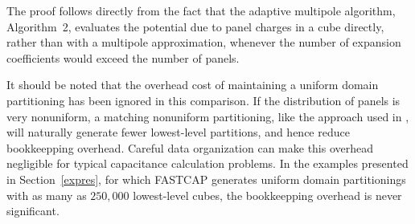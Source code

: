 The proof follows directly from the fact that the adaptive multipole
algorithm, Algorithm~2, evaluates the potential due to panel charges in a cube
directly, rather than with a multipole approximation, whenever the
number of expansion coefficients would exceed the number of panels.

It should be noted that the overhead cost of maintaining a uniform
domain partitioning has been ignored in this comparison.  If the
distribution of panels is very nonuniform, a matching nonuniform
partitioning, like the approach used in \cite{carrie}, will naturally
generate fewer lowest-level partitions, and hence reduce bookkeepping
overhead. Careful data organization can make this overhead negligible
for typical capacitance calculation problems.  In the examples
presented in Section~\ref{expres}, for which FASTCAP generates
uniform domain partitionings with as many as $ 250,000 $ lowest-level
cubes, the bookkeepping overhead is never significant.
